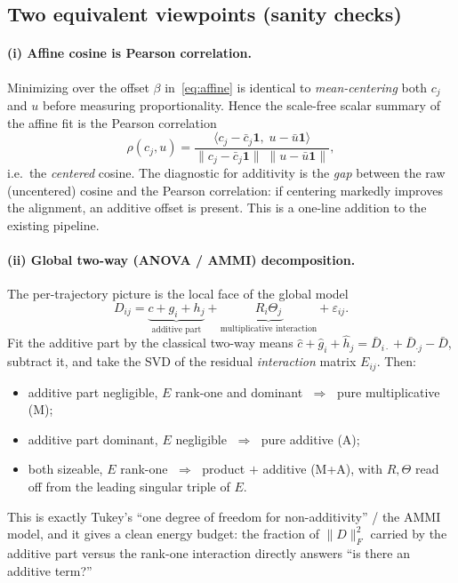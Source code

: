 \documentclass{article}
\begin{document}
\subsection{Two equivalent viewpoints (sanity checks)}

\paragraph{(i) Affine cosine is Pearson correlation.} Minimizing over the
offset $\beta$ in~\eqref{eq:affine} is identical to \emph{mean-centering} both
$c_{j}$ and $u$ before measuring proportionality. Hence the scale-free scalar
summary of the affine fit is the Pearson correlation
\begin{equation}
\rho(c_{j},u)=
\frac{\langle c_{j}-\bar c_{j}\mathbf 1,\;u-\bar u\mathbf 1\rangle}
{\|c_{j}-\bar c_{j}\mathbf 1\|\;\|u-\bar u\mathbf 1\|},
\end{equation}
i.e.\ the \emph{centered} cosine. The diagnostic for additivity is the
\emph{gap} between the raw (uncentered) cosine and the Pearson correlation:
if centering markedly improves the alignment, an additive offset is present.
This is a one-line addition to the existing pipeline.

\paragraph{(ii) Global two-way (ANOVA / AMMI) decomposition.} The per-trajectory
picture is the local face of the global model
\begin{equation}
D_{ij}=\underbrace{c+g_{i}+h_{j}}_{\text{additive part}}
+\underbrace{R_{i}\Theta_{j}}_{\text{multiplicative interaction}}
+\varepsilon_{ij}.
\label{eq:ammi}
\end{equation}
Fit the additive part by the classical two-way means
$\widehat c+\widehat g_{i}+\widehat h_{j}
=\bar D_{i\cdot}+\bar D_{\cdot j}-\bar D$, subtract it, and take the SVD of the
residual \emph{interaction} matrix $E_{ij}$. Then:
\begin{itemize}
\item additive part negligible, $E$ rank-one and dominant
$\;\Rightarrow\;$ pure multiplicative (M);
\item additive part dominant, $E$ negligible
$\;\Rightarrow\;$ pure additive (A);
\item both sizeable, $E$ rank-one
$\;\Rightarrow\;$ product $+$ additive (M+A), with $R,\Theta$ read off from the
leading singular triple of $E$.
\end{itemize}
This is exactly Tukey's ``one degree of freedom for non-additivity'' / the AMMI
model, and it gives a clean energy budget: the fraction of $\|D\|_{F}^{2}$
carried by the additive part versus the rank-one interaction directly answers
``is there an additive term?''
\end{document}
